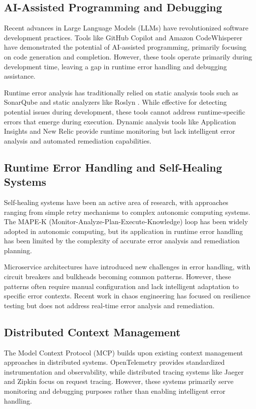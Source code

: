 \subsection{AI-Assisted Programming and Debugging}
Recent advances in Large Language Models (LLMs) have revolutionized software development practices. Tools like GitHub Copilot \cite{copilot2021} and Amazon CodeWhisperer \cite{codewhisperer2022} have demonstrated the potential of AI-assisted programming, primarily focusing on code generation and completion. However, these tools operate primarily during development time, leaving a gap in runtime error handling and debugging assistance.

Runtime error analysis has traditionally relied on static analysis tools such as SonarQube \cite{sonarqube2023} and static analyzers like Roslyn \cite{roslyn2015}. While effective for detecting potential issues during development, these tools cannot address runtime-specific errors that emerge during execution. Dynamic analysis tools like Application Insights \cite{appinsights2023} and New Relic \cite{newrelic2023} provide runtime monitoring but lack intelligent error analysis and automated remediation capabilities.

\subsection{Runtime Error Handling and Self-Healing Systems}
Self-healing systems have been an active area of research, with approaches ranging from simple retry mechanisms to complex autonomic computing systems. The MAPE-K (Monitor-Analyze-Plan-Execute-Knowledge) loop \cite{mapek2003} has been widely adopted in autonomic computing, but its application in runtime error handling has been limited by the complexity of accurate error analysis and remediation planning.

Microservice architectures have introduced new challenges in error handling, with circuit breakers \cite{hystrix2012} and bulkheads \cite{bulkhead2014} becoming common patterns. However, these patterns often require manual configuration and lack intelligent adaptation to specific error contexts. Recent work in chaos engineering \cite{chaos2017} has focused on resilience testing but does not address real-time error analysis and remediation.

\subsection{Distributed Context Management}
The Model Context Protocol (MCP) builds upon existing context management approaches in distributed systems. OpenTelemetry \cite{opentelemetry2023} provides standardized instrumentation and observability, while distributed tracing systems like Jaeger \cite{jaeger2019} and Zipkin \cite{zipkin2012} focus on request tracing. However, these systems primarily serve monitoring and debugging purposes rather than enabling intelligent error handling.

